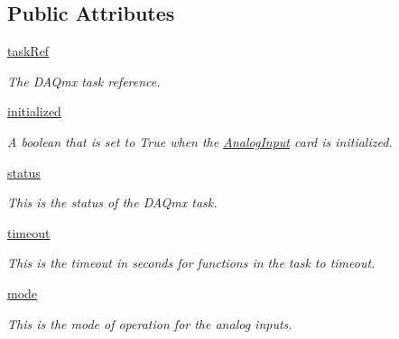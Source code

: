 \subsection*{Public Attributes}
\begin{DoxyCompactItemize}
\item 
\hyperlink{class_chassis_8git_1_1_analog_input_1_1_analog_input_a6f0dccdf025bc556dbc23d8679c57634}{task\-Ref}
\begin{DoxyCompactList}\small\item\em The D\-A\-Qmx task reference. \end{DoxyCompactList}\item 
\hyperlink{class_chassis_8git_1_1_analog_input_1_1_analog_input_ab5ba47e0b3fb604c03340174fe64e080}{initialized}
\begin{DoxyCompactList}\small\item\em A boolean that is set to True when the \hyperlink{class_chassis_8git_1_1_analog_input_1_1_analog_input}{Analog\-Input} card is initialized. \end{DoxyCompactList}\item 
\hyperlink{class_chassis_8git_1_1_analog_input_1_1_analog_input_a8708c56cbdab15b27fa69a4612320789}{status}
\begin{DoxyCompactList}\small\item\em This is the status of the D\-A\-Qmx task. \end{DoxyCompactList}\item 
\hyperlink{class_chassis_8git_1_1_analog_input_1_1_analog_input_a34c7451ada43f7d73cc2598e3ef0bd73}{timeout}
\begin{DoxyCompactList}\small\item\em This is the timeout in seconds for functions in the task to timeout. \end{DoxyCompactList}\item 
\hyperlink{class_chassis_8git_1_1_analog_input_1_1_analog_input_a61eaaf8f916dbc95c11323045b497377}{mode}
\begin{DoxyCompactList}\small\item\em This is the mode of operation for the analog inputs. \end{DoxyCompactList}\end{DoxyCompactItemize}
